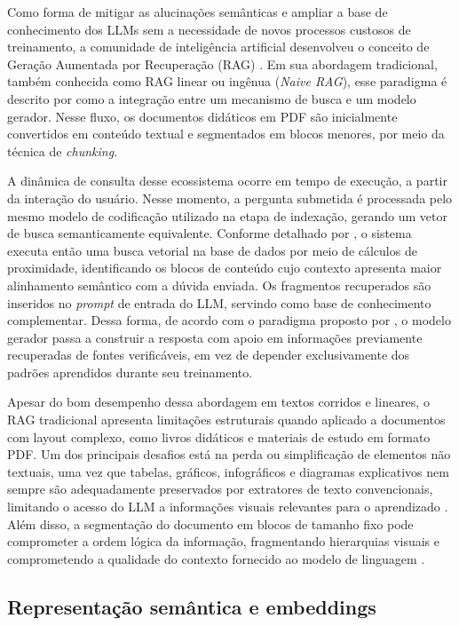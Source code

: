Como forma de mitigar as alucinações semânticas e ampliar a base de conhecimento dos LLMs sem a necessidade de novos processos custosos de treinamento, a comunidade de inteligência artificial desenvolveu o conceito de Geração Aumentada por Recuperação (RAG) . Em sua abordagem tradicional, também conhecida como RAG linear ou ingênua (\textit{Naive RAG}), esse paradigma é descrito por  como a integração entre um mecanismo de busca e um modelo gerador. Nesse fluxo, os documentos didáticos em PDF são inicialmente convertidos em conteúdo textual e segmentados em blocos menores, por meio da técnica de \textit{chunking}.

A dinâmica de consulta desse ecossistema ocorre em tempo de execução, a partir da interação do usuário. Nesse momento, a pergunta submetida é processada pelo mesmo modelo de codificação utilizado na etapa de indexação, gerando um vetor de busca semanticamente equivalente. Conforme detalhado por , o sistema executa então uma busca vetorial na base de dados por meio de cálculos de proximidade, identificando os blocos de conteúdo cujo contexto apresenta maior alinhamento semântico com a dúvida enviada. Os fragmentos recuperados são inseridos no \textit{prompt} de entrada do LLM, servindo como base de conhecimento complementar. Dessa forma, de acordo com o paradigma proposto por , o modelo gerador passa a construir a resposta com apoio em informações previamente recuperadas de fontes verificáveis, em vez de depender exclusivamente dos padrões aprendidos durante seu treinamento.
 
Apesar do bom desempenho dessa abordagem em textos corridos e lineares, o RAG tradicional apresenta limitações estruturais quando aplicado a documentos com layout complexo, como livros didáticos e materiais de estudo em formato PDF. Um dos principais desafios está na perda ou simplificação de elementos não textuais, uma vez que tabelas, gráficos, infográficos e diagramas explicativos nem sempre são adequadamente preservados por extratores de texto convencionais, limitando o acesso do LLM a informações visuais relevantes para o aprendizado . Além disso, a segmentação do documento em blocos de tamanho fixo pode comprometer a ordem lógica da informação, fragmentando hierarquias visuais e comprometendo a qualidade do contexto fornecido ao modelo de linguagem .

\subsection{Representação semântica e embeddings}
\label{subsec:embeddings}

